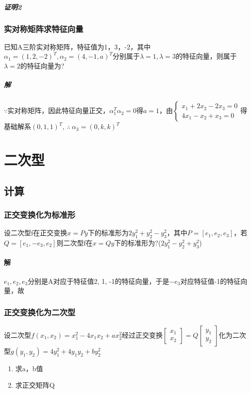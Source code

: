 \subparagraph{证明2}


\subsubsection{实对称矩阵求特征向量}
已知A三阶实对称矩阵，特征值为1，3，-2，其中\(\alpha_1 = (1, 2, -2)^T, \alpha_2 = (4, -1, a)^T\)分别属于\(\lambda = 1, \lambda = 3\)的特征向量，则属于\(\lambda = 2\)的特征向量为?
\subparagraph{解}
\(\because\)实对称矩阵，因此特征向量正交，\(\alpha_1^T\alpha_2 = 0\)得\(a = 1\)，由\(\begin{cases}
    x_1 + 2x_2 - 2x_3 = 0 \\ 
    4x_1 - x_2 + x_3 = 0
\end{cases}\)得基础解系\((0, 1, 1)^T,\ \therefore\ \alpha_3 = (0, k, k)^T\)


\section{二次型}

\subsection{计算}

\subsubsection{正交变换化为标准形}
设二次型f在正交变换\(x = Py\)下的标准形为\(2y_1^2 + y_2^2 - y_3^2\)，其中\(P = [e_1, e_2, e_3]\)，若\(Q = [e_1, -e_3, e_2]\)则二次型f在\(x = Qy\)下的标准形为?(\(2y_1^2 - y_2^2 + y_3^2\))

\paragraph{解}
\(e_1, e_2, e_3\)分别是A对应于特征值2, 1, -1的特征向量，于是\(-e_3\)对应特征值-1的特征向量，故


\subsubsection{正交变换化为二次型}
设二次型\(f(x_1, x_2) = x_1^2 - 4x_1x_2 + ax_2^2\)经过正交变换\(\begin{bmatrix}
    x_1 \\ 
    x_2
\end{bmatrix} = Q\begin{bmatrix}
    y_1 \\ 
    y_2
\end{bmatrix}\)化为二次型\(g(y_1, y_2) = 4y_1^2 + 4y_1y_2 + by_2^2\)
\begin{enumerate}
    \item 求a，b值
    \item 求正交矩阵Q
\end{enumerate}

